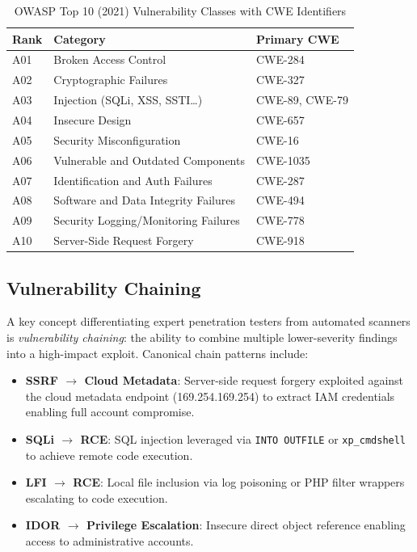 \documentclass[12pt,a4paper,oneside,openany]{book}
\newcommand{\code}[1]{\texttt{#1}}
\newcommand{\term}[1]{\textit{#1}}
\begin{document}
\begin{table}[h]
\centering
\caption{OWASP Top 10 (2021) Vulnerability Classes with CWE Identifiers}
\label{tab:owasp_top10}
\begin{tabular}{lll}
\toprule
\textbf{Rank} & \textbf{Category} & \textbf{Primary CWE} \\
\midrule
A01 & Broken Access Control & CWE-284 \\
A02 & Cryptographic Failures & CWE-327 \\
A03 & Injection (SQLi, XSS, SSTI\ldots) & CWE-89, CWE-79 \\
A04 & Insecure Design & CWE-657 \\
A05 & Security Misconfiguration & CWE-16 \\
A06 & Vulnerable and Outdated Components & CWE-1035 \\
A07 & Identification and Auth Failures & CWE-287 \\
A08 & Software and Data Integrity Failures & CWE-494 \\
A09 & Security Logging/Monitoring Failures & CWE-778 \\
A10 & Server-Side Request Forgery & CWE-918 \\
\bottomrule
\end{tabular}
\end{table}

\subsection{Vulnerability Chaining}

A key concept differentiating expert penetration testers from automated scanners is \term{vulnerability chaining}: the ability to combine multiple lower-severity findings into a high-impact exploit. Canonical chain patterns include:

\begin{itemize}
\item \textbf{SSRF $\rightarrow$ Cloud Metadata}: Server-side request forgery exploited against the cloud metadata endpoint (169.254.169.254) to extract IAM credentials enabling full account compromise.
\item \textbf{SQLi $\rightarrow$ RCE}: SQL injection leveraged via \code{INTO OUTFILE} or \code{xp\_cmdshell} to achieve remote code execution.
\item \textbf{LFI $\rightarrow$ RCE}: Local file inclusion via log poisoning or PHP filter wrappers escalating to code execution.
\item \textbf{IDOR $\rightarrow$ Privilege Escalation}: Insecure direct object reference enabling access to administrative accounts.
\end{itemize}
\end{document}
